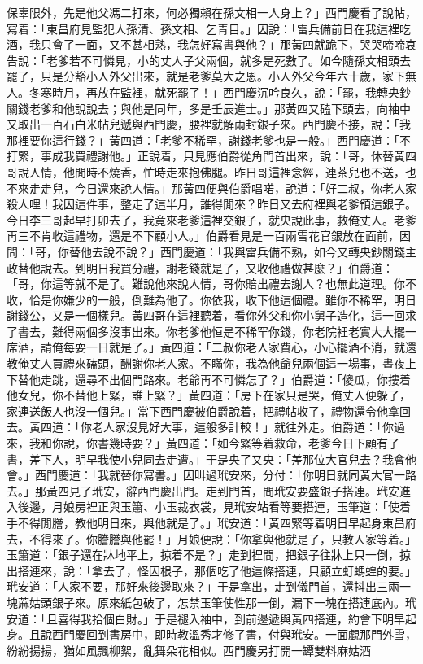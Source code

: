 保辜限外，先是他父馮二打來，何必獨賴在孫文相一人身上？」西門慶看了說帖，寫着：「東昌府見監犯人孫清、孫文相、乞青目。」因說：「雷兵備前日在我這裡吃酒，我只會了一面，又不甚相熟，我怎好寫書與他？」那黃四就跪下，哭哭啼啼哀告說：「老爹若不可憐見，小的丈人子父兩個，就多是死數了。如今隨孫文相頭去罷了，只是分豁小人外父出來，就是老爹莫大之恩。小人外父今年六十歲，家下無人。冬寒時月，再放在監裡，就死罷了！」西門慶沉吟良久，說：「罷，我轉央鈔關錢老爹和他說說去；與他是同年，多是壬辰進士。」那黃四又磕下頭去，向袖中又取出一百石白米帖兒遞與西門慶，腰裡就解兩封銀子來。西門慶不接，說：「我那裡要你這行錢？」黃四道：「老爹不稀罕，謝錢老爹也是一般。」西門慶道：「不打緊，事成我買禮謝他。」正說着，只見應伯爵從角門首出來，說：「哥，休替黃四哥說人情，他閒時不燒香，忙時走來抱佛腿。昨日哥這裡念經，連茶兒也不送，也不來走走兒，今日還來說人情。」那黃四便與伯爵唱喏，說道：「好二叔，你老人家殺人哩！我因這件事，整走了這半月，誰得閒來？昨日又去府裡與老爹領這銀子。今日李三哥起早打卯去了，我竟來老爹這裡交銀子，就央說此事，救俺丈人。老爹再三不肯收這禮物，還是不下顧小人。」伯爵看見是一百兩雪花官銀放在面前，因問：「哥，你替他去說不說？」西門慶道：「我與雷兵備不熟，如今又轉央鈔關錢主政替他說去。到明日我買分禮，謝老錢就是了，又收他禮做甚麼？」伯爵道：「哥，你這等就不是了。難說他來說人情，哥你賠出禮去謝人？也無此道理。你不收，恰是你嫌少的一般，倒難為他了。你依我，收下他這個禮。雖你不稀罕，明日謝錢公，又是一個樣兒。黃四哥在這裡聽着，看你外父和你小舅子造化，這一回求了書去，難得兩個多沒事出來。你老爹他恒是不稀罕你錢，你老院裡老實大大擺一席酒，請俺每耍一日就是了。」黃四道：「二叔你老人家費心，小心擺酒不消，就還教俺丈人買禮來磕頭，酬謝你老人家。不瞞你，我為他爺兒兩個這一場事，晝夜上下替他走跳，還尋不出個門路來。老爺再不可憐怎了？」伯爵道：「傻瓜，你摟着他女兒，你不替他上緊，誰上緊？」黃四道：「房下在家只是哭，俺丈人便躲了，家連送飯人也沒一個兒。」當下西門慶被伯爵說着，把禮帖收了，禮物還令他拿回去。黃四道：「你老人家沒見好大事，這般多計較！」就往外走。伯爵道：「你過來，我和你說，你書幾時要？」黃四道：「如今緊等着救命，老爹今日下顧有了書，差下人，明早我使小兒同去走遭。」于是央了又央：「差那位大官兒去？我會他會。」西門慶道：「我就替你寫書。」因叫過玳安來，分付：「你明日就同黃大官一路去。」那黃四見了玳安，辭西門慶出門。走到門首，問玳安要盛銀子搭連。玳安進入後邊，月娘房裡正與玉簫、小玉裁衣裳，見玳安站看等要搭連，玉筆道：「使着手不得閒謄，教他明日來，與他就是了。」玳安道：「黃四緊等着明日早起身東昌府去，不得來了。你謄謄與他罷！」月娘便說：「你拿與他就是了，只教人家等着。」玉簫道：「銀子還在牀地平上，掠着不是？」走到裡間，把銀子往牀上只一倒，掠出搭連來，說：「拿去了，怪囚根子，那個吃了他這條搭連，只顧立虰螞蝗的要。」玳安道：「人家不要，那好來後邊取來？」于是拿出，走到儀門首，還抖出三兩一塊蔴姑頭銀子來。原來紙包破了，怎禁玉筆使性那一倒，漏下一塊在搭連底內。玳安道：「且喜得我拾個白財。」于是褪入袖中，到前邊遞與黃四搭連，約會下明早起身。且說西門慶回到書房中，即時教溫秀才修了書，付與玳安。一面覷那門外雪，紛紛揚揚，猶如風飄柳絮，亂舞朵花相似。西門慶另打開一罈雙料麻姑酒 